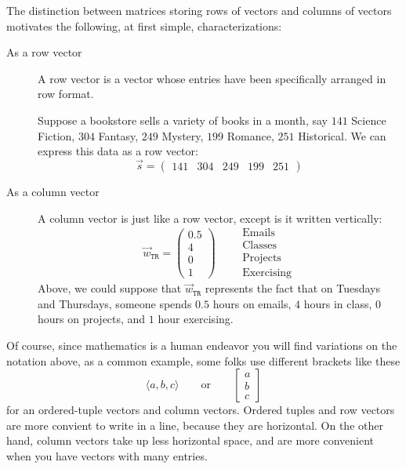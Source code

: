 \documentclass{ximera}
\begin{document}
\begin{exploration}

    The distinction between matrices storing rows of vectors and columns of vectors motivates the following, at first simple, characterizations:

    \begin{description}
        \item[As a row vector] A row vector is a vector whose entries have been specifically arranged in row format.
        
        Suppose a bookstore sells a variety of books in a month, say
          $141$ Science Fiction,
          $304$ Fantasy,
          $249$ Mystery,
          $199$ Romance,
          $251$ Historical.
          We can express this data as a row vector:
          \[
          \vec{s} = \begin{pmatrix}141 & 304 & 249 & 199 & 251 \end{pmatrix}
          \]
        \item[As a column vector] A column vector is just like a row vector,
          except is it written vertically:
          \[
          \vec{w}_{\texttt{TR}} = \begin{pmatrix}
            0.5\\ 4 \\ 0 \\ 1\end{pmatrix}
            \qquad
            \begin{array}{l}
            \text{Emails}\\
            \text{Classes}\\
            \text{Projects}\\
            \text{Exercising}
          \end{array}
          \]
          Above, we could suppose that $\vec{w}_{\texttt{TR}}$ represents the
          fact that on Tuesdays and Thursdays, someone spends $0.5$ hours on
          emails, $4$ hours in class, $0$ hours on projects, and $1$ hour
          exercising.
        \end{description}
        
        
        Of course, since mathematics is a human endeavor you will find variations on the notation above, as a common example, some folks use different brackets like these
        \[
        \langle a, b, c\rangle \qquad\text{or}\qquad
        \begin{bmatrix}
          a\\
          b\\
          c
        \end{bmatrix}
        \]
        for an ordered-tuple vectors and column vectors. Ordered tuples and
        row vectors are more convient to write in a line, because they are
        horizontal. On the other hand, column vectors take up less horizontal
        space, and are more convenient when you have vectors with many entries.
        

\end{exploration}
\end{document}
